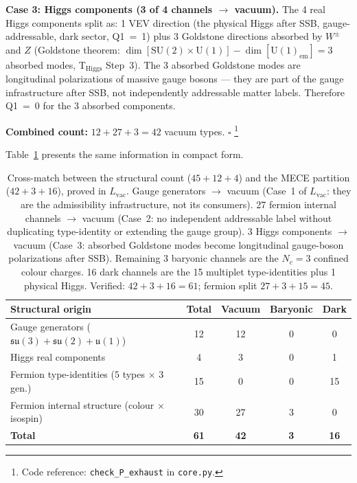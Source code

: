 \documentclass[11pt]{article}
\newcommand{\coderef}[2]{\footnote{Code reference: \texttt{#1} in \texttt{#2}.}}
\newcommand{\SU}{\mathrm{SU}}
\newcommand{\U}{\mathrm{U}}
\begin{document}
\begin{tcolorbox}[apfbox, title={Lemma $L_{\mathrm{vac}}$ (Vacuum Sector Assignment)}]
\medskip\noindent\textbf{Case 3: Higgs components (3 of 4 channels $\to$ vacuum).}
The 4 real Higgs components split as: 1 VEV direction (the physical Higgs after SSB, gauge-addressable, dark sector, Q1~=~1) plus 3 Goldstone directions absorbed by $W^\pm$ and $Z$ (Goldstone theorem: $\dim[\SU(2) \times \U(1)] - \dim[\U(1)_{\mathrm{em}}] = 3$ absorbed modes, T$_{\mathrm{Higgs}}$ Step~3).  The 3 absorbed Goldstone modes are longitudinal polarizations of massive gauge bosons --- they are part of the gauge infrastructure after SSB, not independently addressable matter labels.  Therefore Q1~=~0 for the 3 absorbed components.

\medskip\noindent\textbf{Combined count:} $12 + 27 + 3 = 42$ vacuum types.  $\square$
\coderef{check\_P\_exhaust}{core.py}
\end{tcolorbox}

Table~\ref{tab:crossmatch} presents the same information in compact form.

\begin{table}[ht]
\centering\small
\begin{tabular}{lcccc}
\toprule
\textbf{Structural origin} & \textbf{Total} & \textbf{Vacuum} & \textbf{Baryonic} & \textbf{Dark} \\
\midrule
Gauge generators ($\mathfrak{su}(3)\!+\mathfrak{su}(2)\!+\mathfrak{u}(1)$) & 12 & 12 & 0 & 0 \\
Higgs real components & 4 & 3 & 0 & 1 \\
Fermion type-identities ($5$ types $\times$ $3$ gen.) & 15 & 0 & 0 & 15 \\
Fermion internal structure (colour $\times$ isospin) & 30 & 27 & 3 & 0 \\
\midrule
\textbf{Total} & \textbf{61} & \textbf{42} & \textbf{3} & \textbf{16} \\
\bottomrule
\end{tabular}
\caption{Cross-match between the structural count ($45 + 12 + 4$) and the MECE partition ($42 + 3 + 16$), proved in $L_{\mathrm{vac}}$.  Gauge generators $\to$ vacuum (Case~1 of $L_{\mathrm{vac}}$: they are the admissibility infrastructure, not its consumers).  27 fermion internal channels $\to$ vacuum (Case~2: no independent addressable label without duplicating type-identity or extending the gauge group).  3 Higgs components $\to$ vacuum (Case~3: absorbed Goldstone modes become longitudinal gauge-boson polarizations after SSB).  Remaining 3 baryonic channels are the $N_c = 3$ confined colour charges.  16 dark channels are the 15 multiplet type-identities plus 1 physical Higgs.  Verified: $42 + 3 + 16 = 61$; fermion split $27 + 3 + 15 = 45$.}
\label{tab:crossmatch}
\end{table}
\end{document}
